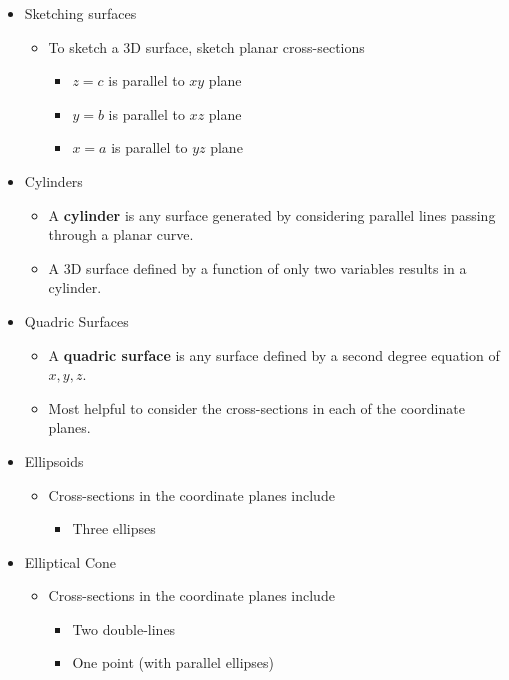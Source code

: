 \documentclass[12pt]{article}
\newcommand{\<}{\left<}
\renewcommand{\>}{\right>}
\begin{document}
\begin{itemize}
\item Sketching surfaces

  \begin{itemize}
  \item To sketch a 3D surface, sketch planar cross-sections
    \begin{itemize}
    \item $z=c$ is parallel to $xy$ plane
    \item $y=b$ is parallel to $xz$ plane
    \item $x=a$ is parallel to $yz$ plane
    \end{itemize}
  \end{itemize}

\item Cylinders

  \begin{itemize}
  \item A \textbf{cylinder} is any surface generated by considering parallel lines passing through a planar curve.
  \item A 3D surface defined by a function of only two variables results in a cylinder.
  \end{itemize}

\item Quadric Surfaces

  \begin{itemize}
  \item A \textbf{quadric surface} is any surface defined by a second degree equation of $x,y,z$.
  \item Most helpful to consider the cross-sections in each of the coordinate planes.
  \end{itemize}

\item Ellipsoids
  \begin{itemize}
  \item Cross-sections in the coordinate planes include
    \begin{itemize}
    \item Three ellipses
    \end{itemize}
  \end{itemize}

\item Elliptical Cone
  \begin{itemize}
  \item Cross-sections in the coordinate planes include
    \begin{itemize}
    \item Two double-lines
    \item One point (with parallel ellipses)
    \end{itemize}
  \end{itemize}


\end{itemize}
\end{document}
